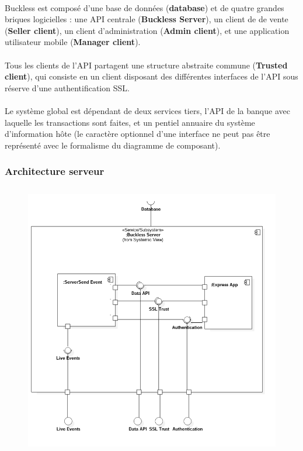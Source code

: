         \paragraph{}
            Buckless est composé d'une base de données (\textbf{database}) et de quatre grandes briques
            logicielles : une API centrale (\textbf{Buckless Server}), un client de de vente
            (\textbf{Seller client}), un client d'administration (\textbf{Admin client}), et une
            application utilisateur mobile (\textbf{Manager client}).

        \paragraph{}
            Tous les clients de l'API partagent une structure abstraite commune (\textbf{Trusted client}),
            qui consiste en un client disposant des différentes interfaces de l'API sous réserve
            d'une authentification SSL.

        \paragraph{}
            Le système global est dépendant de deux services tiers, l'API de la banque avec laquelle
            les transactions sont faites, et un pentiel annuaire du système d'information hôte
            (le caractère optionnel d'une interface ne peut pas être représenté avec le formalisme du
            diagramme de composant).


    \subsubsection{Architecture serveur}
        \begin{figure}[h]
            \centering
            \includegraphics[height=12cm]{./assets/UML/buckless_server.png}
        \end{figure}

